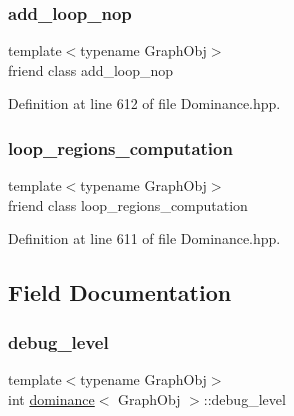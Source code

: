\subsubsection{\texorpdfstring{add\+\_\+loop\+\_\+nop}{add\_loop\_nop}}
{\footnotesize\ttfamily template$<$typename Graph\+Obj$>$ \\
friend class add\+\_\+loop\+\_\+nop\hspace{0.3cm}{\ttfamily [friend]}}



Definition at line 612 of file Dominance.\+hpp.

\mbox{\label{classdominance_adf3162ccf639fca2399b989864815b0c}} 
\subsubsection{\texorpdfstring{loop\+\_\+regions\+\_\+computation}{loop\_regions\_computation}}
{\footnotesize\ttfamily template$<$typename Graph\+Obj$>$ \\
friend class loop\+\_\+regions\+\_\+computation\hspace{0.3cm}{\ttfamily [friend]}}



Definition at line 611 of file Dominance.\+hpp.



\subsection{Field Documentation}
\mbox{\label{classdominance_a5e618cd8f2f0f3a136b43d4e2b4c5516}} 
\subsubsection{\texorpdfstring{debug\+\_\+level}{debug\_level}}
{\footnotesize\ttfamily template$<$typename Graph\+Obj$>$ \\
int \hyperlink{classdominance}{dominance}$<$ Graph\+Obj $>$\+::debug\+\_\+level\hspace{0.3cm}{\ttfamily [private]}}



